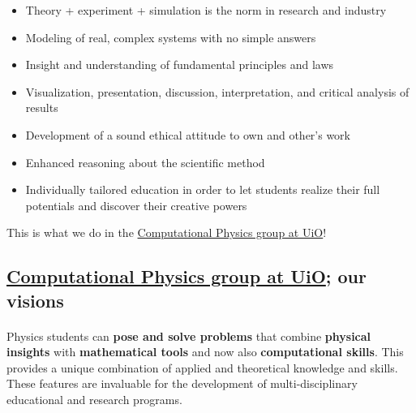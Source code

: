 \documentclass[%
twoside,                 %
final,                   %
10pt]{article}
\begin{document}
\begin{itemize}
\item Theory + experiment + simulation is the norm in research and industry

\item Modeling of real, complex systems with no simple answers

\item Insight and understanding of fundamental principles and laws

\item Visualization, presentation, discussion, interpretation, and critical analysis of results

\item Development of a sound ethical attitude to own and other's work

\item Enhanced reasoning about the scientific method

\item Individually tailored education in order to let students  realize their full potentials and discover their creative powers
\end{itemize}

\noindent
This is what we do in the \href{{http://www.mn.uio.no/fysikk/english/research/groups/computational/index.html}}{Computational Physics group at UiO}!




\subsection*{\href{{http://www.mn.uio.no/fysikk/english/research/groups/computational/index.html}}{Computational Physics group at UiO}; our visions}


\paragraph{}
Physics students can \textbf{pose and solve problems} that combine \textbf{physical insights} with \textbf{mathematical tools} and now also \textbf{computational skills}. This provides a unique combination of applied and theoretical knowledge and skills. These features are invaluable for the development of multi-disciplinary educational and research programs.


\end{document}
